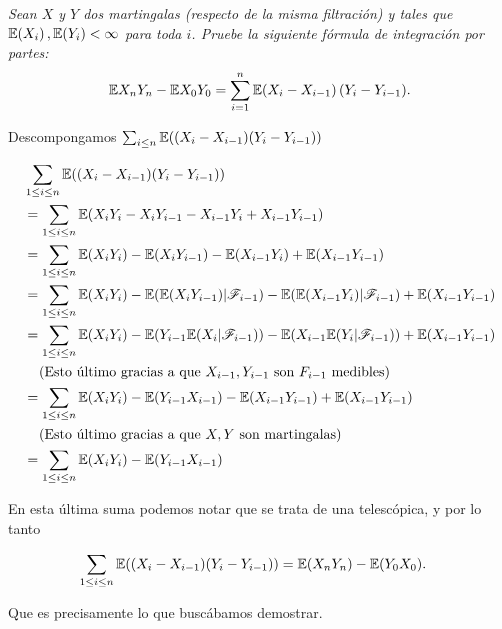 \emph{
    Sean $X$ y $Y$ dos martingalas (respecto de la misma filtraci\'on) y tales que $\mathbb{E}\! \left( X_i \right),\mathbb{E}\! \left( Y_i \right)<\infty$ 
    para toda $i$. Pruebe la siguiente f\'ormula de integraci\'on por partes: 
    \begin{align}
        \mathbb{E}{X_nY_n}-\mathbb{E}{X_0 Y_0}=\sum_{i=1}^n \mathbb{E}{\left( X_i-X_{i-1}\right) \left( Y_i-Y_{i-1}\right) }. 
    \end{align}
}

\afterstatement\par\null

Descompongamos $\sum_{i \leq n} \mathbb{E}((X_i - X_{i-1}) (Y_i - Y_{i-1}))$

\begin{align}
    &\sum_{1 \leq i \leq n} \mathbb{E}((X_i - X_{i-1}) (Y_i - Y_{i-1}))                                                                         \\
    &=  \sum_{1 \leq i \leq n} \mathbb{E}(X_i Y_i - X_i Y_{i-1} - X_{i-1} Y_i + X_{i-1} Y_{i-1})                                                \\
    &=  \sum_{1 \leq i \leq n} \mathbb{E}(X_i Y_i) - \mathbb{E}(X_i Y_{i-1}) - \mathbb{E}(X_{i-1} Y_i) + \mathbb{E}(X_{i-1} Y_{i-1})                                    \\
    &=  \sum_{1 \leq i \leq n} \mathbb{E}(X_i Y_i) - \mathbb{E}(\mathbb{E}(X_i Y_{i-1}) | \mathscr{F}_{i-1}) - \mathbb{E}(\mathbb{E}(X_{i-1} Y_i) | \mathscr{F}_{i-1}) + \mathbb{E}(X_{i-1} Y_{i-1})      \\
    &=  \sum_{1 \leq i \leq n} \mathbb{E}(X_i Y_i) - \mathbb{E}(Y_{i-1} \mathbb{E}(X_i | \mathscr{F}_{i-1})) - \mathbb{E}(X_{i-1}\mathbb{E}(Y_i | \mathscr{F}_{i-1})) + \mathbb{E}(X_{i-1} Y_{i-1})       \\
    &\;\;\;\;\mbox{(Esto último gracias a que $X_{i-1}, Y_{i-1}$ son $F_{i-1}$ medibles)}                                                      \\
    &=  \sum_{1 \leq i \leq n} \mathbb{E}(X_i Y_i) - \mathbb{E}(Y_{i-1} X_{i-1}) - \mathbb{E}(X_{i-1} Y_{i-1}) + \mathbb{E}(X_{i-1} Y_{i-1})                            \\
    &\;\;\;\;\mbox{(Esto último gracias a que $X,Y$ son martingalas)}                                                                          \\
    &=  \sum_{1 \leq i \leq n} \mathbb{E}(X_i Y_i) - \mathbb{E}(Y_{i-1} X_{i-1})                                                                        
\end{align}\par\null

En esta última suma podemos notar que se trata de una telescópica, y por lo tanto

\begin{align}
    \sum_{1 \leq i \leq n} \mathbb{E}((X_i - X_{i-1}) (Y_i - Y_{i-1})) &=  \mathbb{E}(X_n Y_n) - \mathbb{E}(Y_{0} X_{0}).
\end{align}\par\null

Que es precisamente lo que buscábamos demostrar.